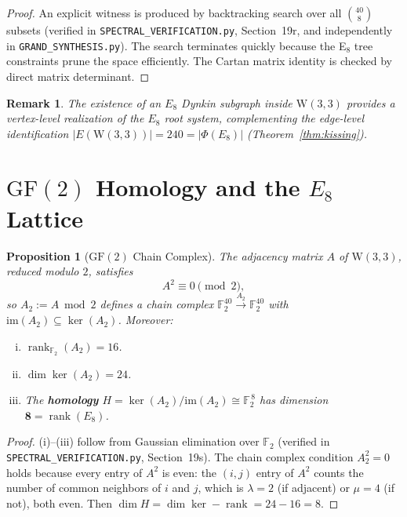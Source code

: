 \documentclass[12pt,a4paper]{article}
\newtheorem{proposition}[theorem]{Proposition}
\newtheorem{remark}[theorem]{Remark}
\newcommand{\W}{\mathrm{W}(3,3)}
\begin{document}
\begin{proof}
An explicit witness is produced by backtracking search over all
$\binom{40}{8}$ subsets (verified in
\texttt{SPECTRAL\_VERIFICATION.py}, Section~19r, and independently
in \texttt{GRAND\_SYNTHESIS.py}).  The search terminates quickly
because the E$_8$ tree constraints prune the space efficiently.
The Cartan matrix identity is checked by direct matrix determinant.
\end{proof}

\begin{remark}
The existence of an $E_8$ Dynkin subgraph inside $\W$ provides a
\emph{vertex-level} realization of the $E_8$ root system, complementing
the \emph{edge-level} identification $|E(\W)| = 240 = |\Phi(E_8)|$
(Theorem~\ref{thm:kissing}).
\end{remark}

\section{$\mathrm{GF}(2)$ Homology and the $E_8$ Lattice}
\label{sec:homology}

\begin{proposition}[$\mathrm{GF}(2)$ Chain Complex]\label{prop:homology}
The adjacency matrix $A$ of\/ $\W$, reduced modulo $2$, satisfies
\[
  A^2 \equiv 0 \pmod{2},
\]
so $A_2 := A \bmod 2$ defines a chain complex
$\mathbb{F}_2^{40} \xrightarrow{A_2} \mathbb{F}_2^{40}$
with $\mathrm{im}(A_2) \subseteq \ker(A_2)$.  Moreover:
\begin{enumerate}[(i)]
  \item $\operatorname{rank}_{\mathbb{F}_2}(A_2) = 16$.
  \item $\dim \ker(A_2) = 24$.
  \item The \textbf{homology}
        $H = \ker(A_2)/\mathrm{im}(A_2) \cong \mathbb{F}_2^{\,8}$
        has dimension $\mathbf{8} = \operatorname{rank}(E_8)$.
\end{enumerate}
\end{proposition}

\begin{proof}
(i)--(iii) follow from Gaussian elimination over $\mathbb{F}_2$
(verified in \texttt{SPECTRAL\_VERIFICATION.py}, Section~19s).
The chain complex condition $A_2^2 = 0$ holds because every entry
of $A^2$ is even: the $(i,j)$ entry of $A^2$ counts the number of
common neighbors of $i$ and $j$, which is $\lambda = 2$ (if adjacent)
or $\mu = 4$ (if not), both even.  Then
$\dim H = \dim\ker - \operatorname{rank} = 24 - 16 = 8$.
\end{proof}
\end{document}
